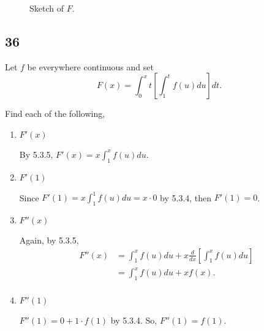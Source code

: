 \documentclass[../hw5.tex]{subfiles}
\begin{document}
\begin{figure*}[ht]
\centering
{}
\caption{Sketch of $F$.}
\end{figure*}


\subsection*{36}
Let $f$ be everywhere continuous and set 
\[F(x)=\int_{0}^{x} t \left[ \int_{1}^{t} f(u) du \right] dt.\]

Find each of the following,

\begin{enumerate}[label= (\alph*)]
    \item $F'(x)$
    
    By 5.3.5, $F'(x) = x \int_{1}^{x} f(u) du$.

    \item $F'(1)$
    
    Since $F'(1) = x \int_{1}^{1} f(u) du = x \cdot 0$ by 5.3.4, then $F'(1) = 0$.

    \item $F''(x)$
    
    Again, by 5.3.5,
    \begin{align*}
        F''(x) &= \int_{1}^{x} f(u) du + x \frac{d}{dx} \left[ \int_{1}^{x} f(u) du \right] \\
        &= \int_{1}^{x} f(u) du + x f(x). \\
    \end{align*}

    \item $F''(1)$
    
    $F''(1) = 0 + 1 \cdot f(1)$ by 5.3.4. So, $F''(1)=f(1)$.

\end{enumerate}
\end{document}
